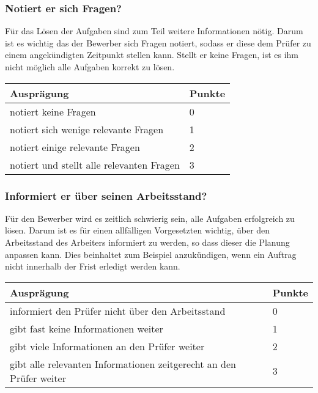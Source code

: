 \subsubsection{Notiert er sich Fragen?}
Für das Lösen der Aufgaben sind zum Teil weitere Informationen nötig. Darum ist es wichtig das der Bewerber sich Fragen notiert, sodass er diese dem Prüfer zu einem angekündigten Zeitpunkt stellen kann. Stellt er keine Fragen, ist es ihm nicht möglich alle Aufgaben korrekt zu lösen.


\begin{center}
  \begin{tabular}{ | p{7cm} | p{1cm} |}
   \hline
   \textbf{Ausprägung} & \textbf{Punkte} \\ \hline
   notiert keine Fragen & 0 \\ \hline
   notiert sich wenige relevante Fragen & 1 \\ \hline
   notiert einige relevante Fragen & 2 \\ \hline
   notiert und stellt alle relevanten Fragen  & 3\\ \hline
  \end{tabular}
\end{center}

\subsubsection{Informiert er über seinen Arbeitsstand?}
Für den Bewerber wird es zeitlich schwierig sein, alle Aufgaben erfolgreich zu lösen. Darum ist es für einen allfälligen Vorgesetzten wichtig, über den Arbeitsstand des Arbeiters informiert zu werden, so dass dieser die Planung anpassen kann. Dies beinhaltet zum Beispiel anzukündigen, wenn ein Auftrag nicht innerhalb der Frist erledigt werden kann.

\begin{center}
  \begin{tabular}{ | p{7cm} | p{1cm} |}
   \hline
   \textbf{Ausprägung} & \textbf{Punkte} \\ \hline
   informiert den Prüfer nicht über den Arbeitsstand & 0 \\ \hline
   gibt fast keine Informationen weiter & 1 \\ \hline
   gibt viele Informationen an den Prüfer weiter & 2 \\ \hline
   gibt alle relevanten Informationen zeitgerecht an den Prüfer weiter & 3\\ \hline
  \end{tabular}
\end{center}

